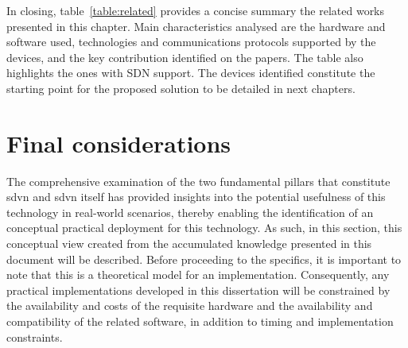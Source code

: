 In closing, table~\ref{table:related} provides a concise summary the related works presented in this chapter. Main characteristics analysed are the hardware and software used, technologies and communications protocols supported by the devices, and the key contribution identified on the papers. The table also highlights the ones with SDN support. The devices identified constitute the starting point for the proposed solution to be detailed in next chapters.


\section{Final considerations} %
\label{sec:final_considerations}

The comprehensive examination of the two fundamental pillars that constitute \gls{sdvn} and \gls{sdvn} itself has provided insights into the potential usefulness of this technology in real-world scenarios, thereby enabling the identification of an conceptual practical deployment for this technology. As such, in this section, this conceptual view created from the accumulated knowledge presented in this document will be described.
Before proceeding to the specifics, it is important to note that this is a theoretical model for an implementation. Consequently, any practical implementations developed in this dissertation will be constrained by the availability and costs of the requisite hardware and the availability and compatibility of the related software, in addition to timing and implementation constraints.    

